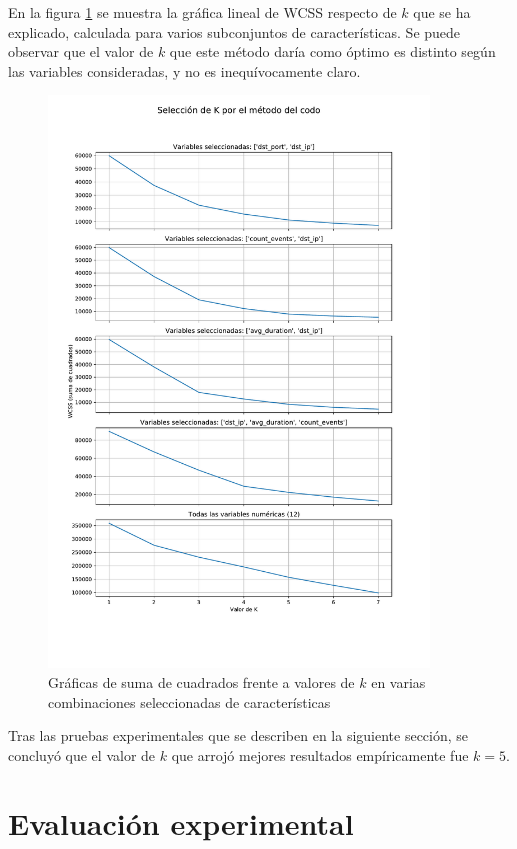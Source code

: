 En la figura \ref{fig:codo} se muestra la gráfica lineal de WCSS respecto de $k$ que se ha explicado, calculada para varios subconjuntos de características.
Se puede observar que el valor de $k$ que este método daría como óptimo es distinto según las variables consideradas, y no es inequívocamente claro.

\begin{figure}[h!]
    \centering
    \captionsetup{width=0.75\textwidth}
    \includegraphics[width=0.9\textwidth]{../figures/codo.pdf}
    \caption{Gráficas de suma de cuadrados frente a valores de $k$ en varias combinaciones seleccionadas de características}
    \label{fig:codo}
\end{figure}

Tras las pruebas experimentales que se describen en la siguiente sección, se concluyó que el valor de $k$ que arrojó mejores resultados empíricamente fue $k=5$.

\section{Evaluación experimental}\label{sec:evaluacionexperimental}

